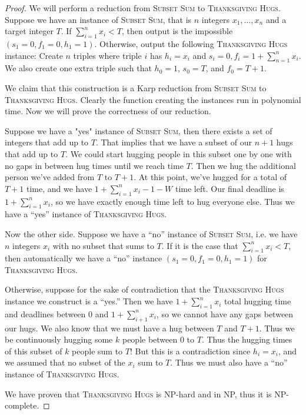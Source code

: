 \documentclass[10pt]{article}
\begin{document}
\begin{proof}
  We will perform a reduction from \textsc{Subset Sum} to \textsc{Thanksgiving Hugs}. Suppose we have an instance of \textsc{Subset Sum}, that is \(n\) integers \(x_1, \ldots, x_n\) and a target integer \(T\). If \(\sum_{i = 1}^n x_i < T\), then output is the impossible \((s_1 = 0, f_1 = 0, h_1 = 1)\). Otherwise, output the following \textsc{Thanksgiving Hugs} instance: Create \(n\) triples where triple \(i\) has \(h_i = x_i\) and \(s_i = 0, f_i = 1 + \sum_{n=1}^n x_i\). We also create one extra triple such that \(h_0 = 1\), \(s_0 = T\), and \(f_0 = T+1\). 
  
  We claim that this construction is a Karp reduction from \textsc{Subset Sum} to \textsc{Thanksgiving Hugs}. Clearly the function creating the instances run in polynomial time. Now we will prove the correctness of our reduction.

  Suppose we have a "yes" instance of \textsc{Subset Sum}, then there exists a set of integers that add up to \(T\). That implies that we have a subset of our \(n + 1\) hugs that add up to \(T\). We could start hugging people in this subset one by one with no gaps in between hug times until we reach time \(T\). Then we hug the additional person we've added from \(T\) to \(T + 1\). At this point, we've hugged for a total of \(T + 1\) time, and we have \(1 + \sum_{i = 1}^n x_i - 1 - W\) time left. Our final deadline is \(1 + \sum_{i = 1}^n x_i\), so we have exactly enough time left to hug everyone else. Thus we have a ``yes'' instance of \textsc{Thanksgiving Hugs}.

  Now the other side. Suppose we have a ``no'' instance of \textsc{Subset Sum}, i.e. we have \(n\) integers \(x_i\) with no subset that sums to \(T\). If it is the case that \(\sum_{i = 1}^n x_i < T\), then automatically we have a ``no'' instance \((s_1 = 0, f_1 = 0, h_1 = 1)\) for \textsc{Thanksgiving Hugs}.
  
  Otherwise, suppose for the sake of contradiction that the \textsc{Thanksgiving Hugs} instance we construct is a ``yes.'' Then we have \(1 + \sum_{i = 1}^n x_i\) total hugging time and deadlines between \(0\) and \(1 + \sum_{i + 1}^n x_i\), so we cannot have any gaps between our hugs. We also know that we must have a hug between \(T\) and \(T + 1\). Thus we be continuously hugging some \(k\) people between \(0\) to \(T\). Thus the hugging times of this subset of \(k\) people sum to \(T\)! But this is a contradiction since \(h_i = x_i\), and we assumed that no subset of the \(x_i\) sum to \(T\). Thus we must also have a ``no'' instance of \textsc{Thanksgiving Hugs}.
  
  We have proven that \textsc{Thanksgiving Hugs} is NP-hard and in NP, thus it is NP-complete.
\end{proof}
\end{document}
